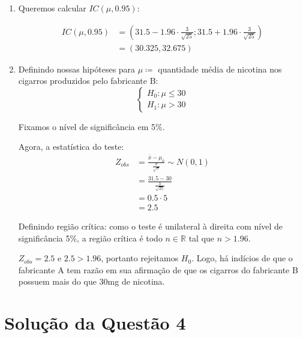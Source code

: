 \documentclass[
	12pt,				%
	openright,			%
	oneside,			%
	a4paper,			%
	english,			%
	brazil,				%
	]{abntex2}
\begin{document}
\begin{enumerate}[label=\alph*)]
    \item Queremos calcular $IC(\mu, 0.95)$:
    
    \begin{align*}
        IC(\mu, 0.95) &= \left(31.5 - 1.96 \cdot \frac{3}{\sqrt{25}};31.5 + 1.96 \cdot \frac{3}{\sqrt{25}}\right)\\
        &= (30.325, 32.675)
    \end{align*}
    
    \item Definindo nossas hipóteses para $\mu \coloneqq$ quantidade média de nicotina nos cigarros produzidos pelo fabricante B: 
    \[
        \begin{cases}
            H_0: \mu \leq 30\\
            H_1: \mu > 30
        \end{cases}
    \]
    
    Fixamos o nível de significância em 5\%.
    
    Agora, a estatística do teste:
    \begin{align*}
        Z_{obs} &= \frac{\bar{x} - \mu_0}{\frac{\sigma}{\sqrt{n}}} \sim N(0, 1)\\
        &= \frac{31.5 - 30}{\frac{3}{\sqrt{25}}}\\
        &= 0.5 \cdot 5\\
        &= 2.5
    \end{align*}
    
    Definindo região crítica: como o teste é unilateral à direita com nível de significância 5\%, a região crítica é todo $n \in \mathbb{R}$ tal que $n > 1.96$.
    
    $Z_{obs} = 2.5$ e $2.5 > 1.96$, portanto rejeitamos $H_0$. Logo, há indícios de que o fabricante A tem razão em sua afirmação de que os cigarros do fabricante B possuem mais do que 30mg de nicotina.
\end{enumerate}


\section{Solução da Questão 4}
\end{document}
